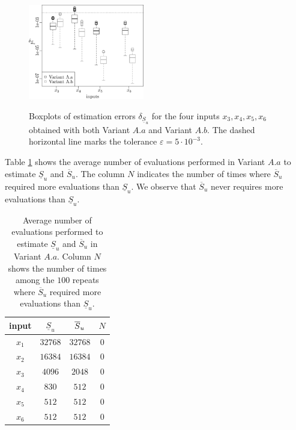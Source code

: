 \begin{figure}[t]
\caption{Boxplots of estimation errors $\delta_{\underline{S}_u}$ for the four inputs $x_3,x_4,x_5,x_6$ obtained with both Variant $A.a$ and Variant $A.b$. The dashed horizontal line marks the tolerance $\varepsilon=5\cdot 10^{-3}$.}
\vspace*{0.2cm}
\centering
\includegraphics[width=0.45\textwidth]{sobolg_box.eps}
\label{boxplots.gfunc}
\end{figure}

{\color{purple} Table \ref{comparison.gfunc} shows the average number of evaluations performed in Variant $A.a$ to estimate $\underline{S}_u$ and $\overline{S}_u$. The column $N$ indicates the number of times where $\overline{S}_u$ required more evaluations than $\underline{S}_u$. We observe that $\overline{S}_u$ never requires more evaluations than $\underline{S}_u$.
\begin{table}[t]
\caption{Average number of evaluations performed to estimate $\underline{S}_u$ and $\overline{S}_u$ in Variant $A.a$. Column $N$ shows the number of times among the $100$ repeats where $\overline{S}_u$ required more evaluations than $\underline{S}_u$.}
\centering
\begin{tabular}{cccc}
\hline
 input & $\underline{S}_u$ & $\ov{$S$}_u$ & $N$ \\ \hline
 $x_1$ & $32768$ & $32768$ & $0$ \\   \hline
 $x_2$ & $16384$ & $16384$ & $0$ \\  \hline
 $x_3$ & $4096$ & $2048$ & $0$ \\  \hline
 $x_4$ & $830$ & $512$ & $0$ \\  \hline
 $x_5$ & $512$ & $512$ & $0$ \\  \hline
 $x_6$ & $512$ & $512$ & $0$ \\  \hline
\end{tabular}
\label{comparison.gfunc}
\end{table}}
\bigskip

